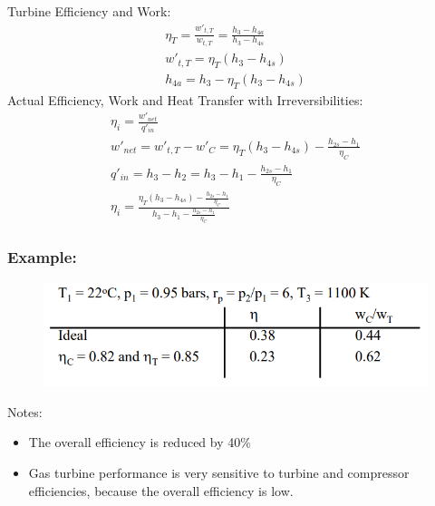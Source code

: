 \documentclass[class=report, crop=false, 12pt,a4paper]{standalone}
\numberwithin{equation}{section}
\begin{document}
Turbine Efficiency and Work:
\begin{gather}
  \eta_T = \frac{w'_{t,T}}{w_{t,T}} = \frac{h_3-h_{4a}}{h_3-h_{4s}} \\[5pt]
  w'_{t,T} = \eta_T(h_3-h_{4s}) \\[5pt]
  h_{4a} = h_3-\eta_T(h_3-h_{4s})
\end{gather}
Actual Efficiency, Work and Heat Transfer with Irreversibilities:
\begin{gather}
  \eta_i = \frac{w'_{net}}{q'_{in}} \\[5pt]
  w'_{net} = w'_{t,T} - w'_C = \eta_T(h_3-h_{4s})-\frac{h_{2s}-h_1}{\eta_C} \\[5pt]
  q'_{in} = h_3-h_2 = h_3-h_1-\frac{h_{2s}-h_1}{\eta_C} \\[5pt]
  \eta_i = \frac{\eta_T(h_3-h_{4s})-\frac{h_{2s}-h_1}{\eta_C}}{h_3-h_1-\frac{h_{2s}-h_1}{\eta_C}}
\end{gather}
\subsubsection{Example:}
\begin{figure}[H]
  \centering
  \includegraphics[width = 0.8 \textwidth]{../img/diagram164.png}
  \caption{}
\end{figure}
Notes:
\begin{itemize}[noitemsep]
  \item The overall efficiency is reduced by 40\%
  \item Gas turbine performance is very sensitive to turbine and compressor efficiencies, because the overall efficiency is low.
\end{itemize}
\end{document}
